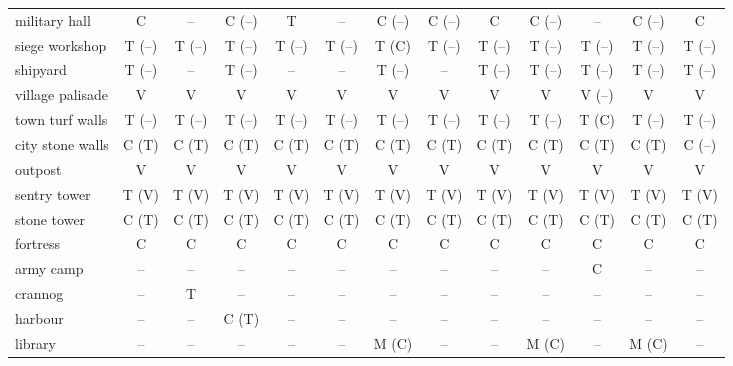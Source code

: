 \documentclass{article}
\begin{document}
\begin{tabular}{l|cccc|cccc|cccc}
military hall     & C & -- & C (--) & T & -- & C (--) & C (--) & C & C (--) & -- & C (--) & C \\ %
siege workshop    & T (--) & T (--) & T (--) & T (--) & T (--) & T (C) & T (--) & T (--) & T (--) & T (--) & T (--) & T (--) \\
shipyard          & T (--) & -- & T (--) & -- & -- & T (--) & -- & T (--) & T (--) & T (--) & T (--) & T (--) \\
\hline %
village palisade  & V & V & V & V & V & V & V & V & V & V (--) & V & V \\
town turf walls   & T (--) & T (--) & T (--) & T (--) & T (--) & T (--) & T (--) & T (--) & T (--) & T (C) & T (--) & T (--) \\
city stone walls  & C (T) & C (T) & C (T) & C (T) & C (T) & C (T) & C (T) & C (T) & C (T) & C (T) & C (T) & C (--) \\
outpost           & V & V & V & V & V & V & V & V & V & V & V & V \\
sentry tower      & T (V) & T (V) & T (V) & T (V) & T (V) & T (V) & T (V) & T (V) & T (V) & T (V) & T (V) & T (V) \\
stone tower       & C (T) & C (T) & C (T) & C (T) & C (T) & C (T) & C (T) & C (T) & C (T) & C (T) & C (T) & C (T) \\
fortress          & C & C & C & C & C & C & C & C & C & C & C & C \\
\hline %
army camp         & -- & -- & -- & -- & -- & -- & -- & -- & -- & C  & -- & -- \\
crannog           & -- & T & -- & -- & -- & -- & -- & -- & -- & -- & -- & -- \\
harbour           & -- & -- & C (T) & -- & -- & -- & -- & -- & -- & -- & -- & -- \\
library           & -- & -- & -- & -- & -- & M (C) & -- & -- & M (C) & -- & M (C) & -- \\

\end{tabular}
\end{document}
